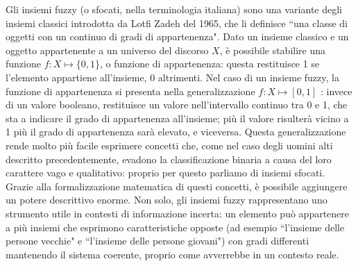\documentclass[12pt,a4paper]{report}
\begin{document}
Gli insiemi fuzzy (o sfocati, nella terminologia italiana) sono una variante degli insiemi classici introdotta da Lotfi Zadeh del 1965, che li definisce ``una classe di oggetti con un continuo di gradi di appartenenza"\cite{fuzzysetspaper}.
Dato un insieme classico e un oggetto appartenente a un universo del discorso $X$, è possibile stabilire una funzione  $f: X \mapsto \{0,1\}$, o funzione di appartenenza: questa restituisce 1 se l'elemento appartiene all'insieme, 0 altrimenti.
Nel caso di un insieme fuzzy, la funzione di appartenenza si presenta nella generalizzazione  $f: X \mapsto [0,1]$ : invece di un valore booleano, restituisce un valore nell'intervallo continuo tra 0 e 1, che sta a indicare il grado di appartenenza all'insieme; più il valore risulterà vicino a 1 più il grado di appartenenza sarà elevato, e viceversa.
Questa generalizzazione rende molto più facile esprimere concetti che, come nel caso degli uomini alti descritto precedentemente, evadono la classificazione binaria a causa del loro carattere vago e qualitativo: proprio per questo parliamo di insiemi sfocati. Grazie alla formalizzazione matematica di questi concetti, è possibile aggiungere un potere descrittivo enorme. Non solo, gli insiemi fuzzy rappresentano uno strumento utile in contesti di informazione incerta: un elemento può appartenere a più insiemi che esprimono caratteristiche opposte (ad esempio ``l'insieme delle persone vecchie" e ``l'insieme delle persone giovani"\cite{fuzzysystemspaper}) con gradi differenti mantenendo il sistema coerente, proprio come avverrebbe in un contesto reale.
\end{document}
